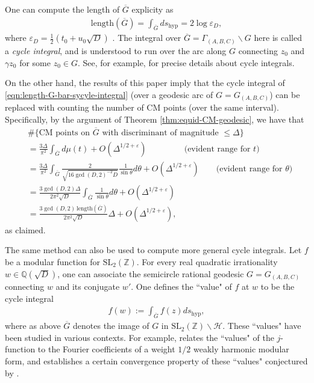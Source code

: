 \documentclass[11pt,letterpaper,reqno]{amsart}
\numberwithin{equation}{section}
\numberwithin{figure}{section}
\numberwithin{table}{section}
\newcommand{\ZZ}{\mathbb{Z}}
\newcommand{\QQ}{\mathbb{Q}}
\newcommand{\SL}{\text{SL}}
\newcommand{\HH}{\mathcal{H}}
\begin{document}
One can compute the length of $\overline G$ explicity as 
\begin{align} \label{eqn:length-G-bar-sycyle-integral}
    \mathrm{length}(\overline G) = \int_{\overline G} ds_\text{hyp} = 2 \log \varepsilon_D,
\end{align}
where $\varepsilon_D = \frac 12 (t_0 + u_0 \sqrt D)$ \cite{sarnak}.
The integral over $\overline G = \Gamma_{(A,B,C)} \backslash G$ here is called a \textit{cycle integral}, and is understood to run over the arc along $G$ connecting $z_0$ and $\gamma z_0$ for some $z_0 \in G$. See, for example, \cite[Section 2]{bengoechea-imamoglu} for precise details about cycle integrals. 

On the other hand, the results of this paper imply that the cycle integral of \eqref{eqn:length-G-bar-sycyle-integral} (over a geodesic arc of $G = G_{(A,B,C)}$) can be replaced with counting the number of CM points (over the same interval). Specifically, by the argument of Theorem \ref{thm:equid-CM-geodesic}, we have that
\begin{align}
    &\# \{
    \text{CM points on $\overline G$ with discriminant of magnitude $\le \Delta$} \} \\
    &= \frac{3\Delta}{\pi^2} \int_{\overline G} d\mu(t) + O(\Delta^{1/2+\varepsilon})  \qquad \qquad\ \ \text{(evident range for $t$)}
    \\
    &= \frac{3\Delta}{\pi^2} \int_{\overline G} \frac{2}{\sqrt{16\gcd(D,2)^{-2} D}} \frac{1}{\sin \theta} d\theta + O(\Delta^{1/2+\varepsilon})
    \qquad \text{(evident range for $\theta$)}
    \\
    &= \frac{3\gcd(D,2)\Delta}{2\pi^2 \sqrt D} \int_{\overline G} \frac{1}{\sin \theta} d\theta + O(\Delta^{1/2+\varepsilon}) \\
    &= \frac{3\gcd(D,2)\,\mathrm{length}(\overline G) }{2\pi^2 \sqrt D} \Delta + O(\Delta^{1/2+\varepsilon}),
\end{align}
as claimed.








The same method can also be used to compute more general cycle integrals. Let $f$ be a modular function for $\SL_2(\ZZ)$. For every real quadratic irrationality $w \in \QQ(\sqrt{D})$, one can associate the semicircle rational geodesic $G = G_{(A,B,C)}$ connecting $w$ and its conjugate $w'$. One defines the ``value" of $f$ at $w$ to be the cycle integral
\begin{align}
    f(w) := \int_{\overline G} f(z) ds_\mathrm{hyp},
\end{align}
where as above $\overline{G}$ denotes the image of $G$ in $\SL_2(\ZZ)\backslash \HH$.
These ``values" have been studied in various contexts. For example, \cite{duke-imamoglu-toth} relates the ``values" of the $j$-function to the Fourier coefficients of a weight $1/2$ weakly harmonic modular form, and \cite{bengoechea-imamoglu} establishes a certain convergence property of these ``values" conjectured by \cite{kaneko}.
\end{document}
